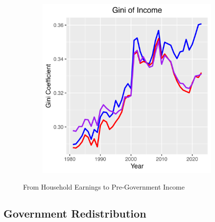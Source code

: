 \documentclass{article}
\begin{document}
\begin{figure}
\begin{subfigure}[t]{0.475\textwidth}
        \label{fig:Trans_Asset_Var2}
    \end{subfigure}
    \begin{subfigure}[t]{0.475\textwidth}
        \centering
        \includegraphics[width=\textwidth]{Fig_4/Fig_4d_Gini_inc.png}
        \label{fig:Trans_Asset_Gini2}
    \end{subfigure}
    \caption{From Household Earnings to Pre-Government Income}
    \label{fig:Trans_Asset}
\end{figure}

\subsection{Government Redistribution}
\end{document}
